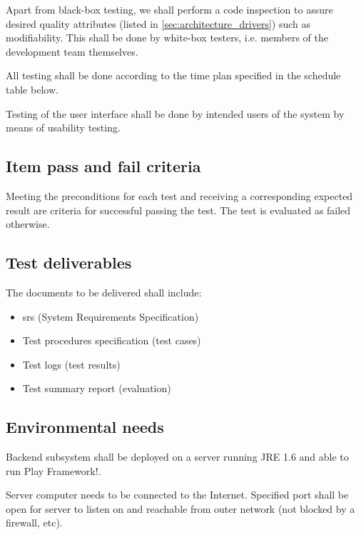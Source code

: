 \documentclass[11pt]{book}
\begin{document}
Apart from black-box testing, we shall perform a code inspection to assure desired quality attributes (listed in \ref{sec:architecture_drivers}) such as modifiability. This shall be done by white-box testers, i.e. members of the development team themselves.

All testing shall be done according to the time plan specified in the schedule table below.

Testing of the user interface shall be done by intended users of the system by means of usability testing. %

\subsection{Item pass and fail criteria}
Meeting the preconditions for each test and receiving a corresponding expected result are criteria for successful passing the test. The test is evaluated as failed otherwise.


\subsection{Test deliverables}
The documents to be delivered shall include:

\begin{itemize}
    \item \gls{srs} (System Requirements Specification)
    \item Test procedures specification (test cases)
    \item Test logs (test results)
    \item Test summary report (evaluation)
\end{itemize}

\subsection{Environmental needs}
Backend subsystem shall be deployed on a server running JRE 1.6 and able to run Play Framework!.

Server computer needs to be connected to the Internet. Specified port shall be open for server to listen on and reachable from outer network (not blocked by a firewall, etc).
\end{document}
